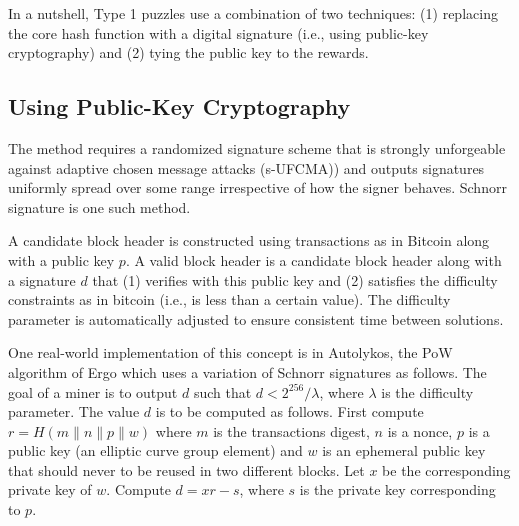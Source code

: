 \documentclass[11pt]{article}
\newcommand{\authnote}[2]{\marginpar{\parbox{\marginparwidth}{\tiny %
  \textsf{#1 {\textcolor{blue}{notes: #2}}}}}%
  \textcolor{blue}{\textbf{\dag}}}
\newcommand{\authnote}[2]{
  \textsf{#1 \textcolor{blue}{: #2}}}
\newcommand{\authnote}[2]{}
\newcommand{\snote}[1]{{\authnote{\textcolor{red}{Scalahub notes}}{#1}}}
\newcommand{\powname}{Autolykos\xspace}
\begin{document}

In a nutshell, Type 1 puzzles use a combination of two techniques: (1) replacing the core hash function with a digital signature (i.e., using public-key cryptography) and (2) tying the public key to the rewards.

\subsection{Using Public-Key Cryptography}

The method requires a randomized signature scheme that is strongly unforgeable against adaptive chosen message attacks (s-UFCMA)) and outputs signatures uniformly spread over some range irrespective of how the signer behaves. Schnorr signature is one such method.

A candidate block header is constructed using transactions as in Bitcoin along with a public key $p$. A valid block header is a candidate block header along with a signature $d$ that (1) verifies with this public key and (2) satisfies the difficulty constraints as in bitcoin (i.e., is less than a certain value). The difficulty parameter is automatically adjusted to ensure consistent time between solutions.

One real-world implementation of this concept is in \powname{}\cite{autolykos}, the PoW algorithm of Ergo which uses a variation of Schnorr signatures as follows. The goal of a miner is to output $d$ such that $d < 2^{256}/\lambda$, where $\lambda$ is the difficulty parameter. The value $d$ is to be computed as follows. First compute $r = H(m\|n\|p\|w)$ where $m$ is the transactions digest, $n$ is a nonce, $p$ is a public key (an elliptic curve group element) and $w$ is an ephemeral public key that should never to be reused in two different blocks. Let $x$ be the corresponding private key of $w$. Compute $d = xr - s$, where $s$ is the private key corresponding to $p$.


\end{document}
